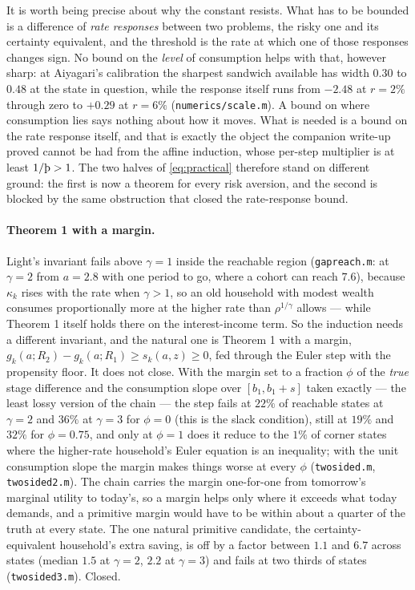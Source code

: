 It is worth being precise about why the constant resists. What has to be bounded is a difference of
\emph{rate responses} between two problems, the risky one and its certainty equivalent, and the
threshold is the rate at which one of those responses changes sign. No bound on the \emph{level} of
consumption helps with that, however sharp: at Aiyagari's calibration the sharpest sandwich
available has width $0.30$ to $0.48$ at the state in question, while the response itself runs from
$-2.48$ at $r=2\%$ through zero to $+0.29$ at $r=6\%$ (\texttt{numerics/scale.m}). A bound on where
consumption lies says nothing about how it moves. What is needed is a bound on the rate response
itself, and that is exactly the object the companion write-up proved cannot be had from the affine
induction, whose per-step multiplier is at least $1/\Thorn>1$. The two halves of
\eqref{eq:practical} therefore stand on different ground: the first is now a theorem for every
risk aversion, and the second is blocked by the same obstruction that closed the rate-response
bound.


\paragraph{Theorem 1 with a margin.} Light's invariant fails above $\gamma=1$ inside the reachable
region (\texttt{gapreach.m}: at $\gamma=2$ from $a=2.8$ with one period to go, where a cohort can reach
$7.6$), because $\kappa_k$ rises with the rate when $\gamma>1$, so an old household with modest wealth
consumes proportionally more at the higher rate than $\rho^{1/\gamma}$ allows --- while Theorem 1 itself
holds there on the interest-income term. So the induction needs a different invariant, and the natural
one is Theorem 1 with a margin, $g_k(a;R_2)-g_k(a;R_1)\ge s_k(a,z)\ge0$, fed through the Euler step
with the propensity floor. It does not close. With the margin set to a fraction $\phi$ of the
\emph{true} stage difference and the consumption slope over $[b_1,b_1+s]$ taken exactly --- the least
lossy version of the chain --- the step fails at $22\%$ of reachable states at $\gamma=2$ and $36\%$ at
$\gamma=3$ for $\phi=0$ (this is the slack condition), still at $19\%$ and $32\%$ for $\phi=0.75$, and
only at $\phi=1$ does it reduce to the $1\%$ of corner states where the higher-rate household's Euler
equation is an inequality; with the unit consumption slope the margin makes things worse at every
$\phi$ (\texttt{twosided.m}, \texttt{twosided2.m}). The chain carries the margin one-for-one from
tomorrow's marginal utility to today's, so a margin helps only where it exceeds what today demands,
and a primitive margin would have to be within about a quarter of the truth at every state. The one
natural primitive candidate, the certainty-equivalent household's extra saving, is off by a factor
between $1.1$ and $6.7$ across states (median $1.5$ at $\gamma=2$, $2.2$ at $\gamma=3$) and fails at
two thirds of states (\texttt{twosided3.m}). Closed.

